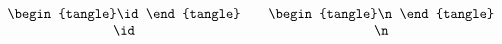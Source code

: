 \documentclass{article}\usepackage{amsmath}\usepackage{t-angles}
\def\SHOW#1#2{\begin{array}{c}\begin{tangle}#1\end{tangle}\\ \hbox{\tt\string#2}\end{array}}
\def\Show#1{\SHOW#1#1}
\begin{document}
$$ \Show\id \quad \Show\n $$
\end{document}
